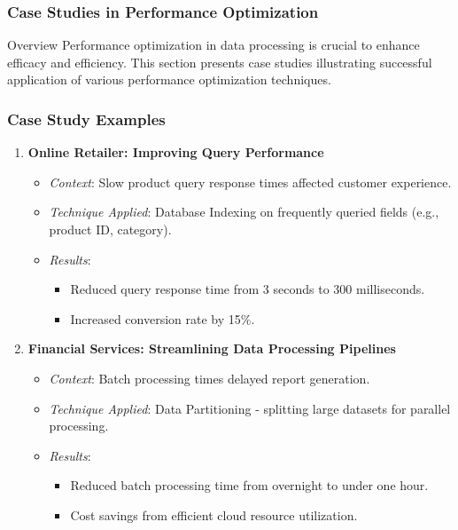 \documentclass[aspectratio=169]{beamer}
\begin{document}
\begin{frame}[fragile]
    \frametitle{Case Studies in Performance Optimization}
    \begin{block}{Overview}
        Performance optimization in data processing is crucial to enhance efficacy and efficiency. This section presents case studies illustrating successful application of various performance optimization techniques.
    \end{block}
\end{frame}

\begin{frame}[fragile]
    \frametitle{Case Study Examples}
    \begin{enumerate}
        \item \textbf{Online Retailer: Improving Query Performance}
            \begin{itemize}
                \item \textit{Context}: Slow product query response times affected customer experience.
                \item \textit{Technique Applied}: Database Indexing on frequently queried fields (e.g., product ID, category).
                \item \textit{Results}:
                    \begin{itemize}
                        \item Reduced query response time from 3 seconds to 300 milliseconds.
                        \item Increased conversion rate by 15\%.
                    \end{itemize}
            \end{itemize}

        \item \textbf{Financial Services: Streamlining Data Processing Pipelines}
            \begin{itemize}
                \item \textit{Context}: Batch processing times delayed report generation.
                \item \textit{Technique Applied}: Data Partitioning - splitting large datasets for parallel processing.
                \item \textit{Results}:
                    \begin{itemize}
                        \item Reduced batch processing time from overnight to under one hour.
                        \item Cost savings from efficient cloud resource utilization.
                    \end{itemize}
            \end{itemize}
    \end{enumerate}
\end{frame}
\end{document}
